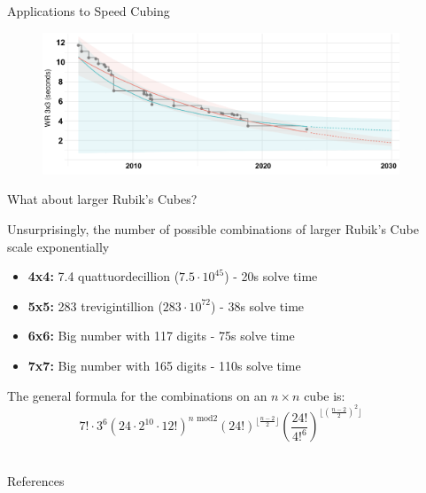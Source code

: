\documentclass[final]{beamer}
\newlength{\sepwidth}
\newlength{\colwidth}
\newcommand{\separatorcolumn}{\begin{column}{\sepwidth}\end{column}}
\begin{document}
\begin{frame}[t]
\begin{columns}[t]
\begin{column}{\colwidth}
\begin{block}{Applications to Speed Cubing}
  \begin{figure}
    \centering
      \includegraphics[width=1.0\textwidth]{logos/solveprogression.png}
  \end{figure}

  \end{block}

  \begin{block}{What about larger Rubik's Cubes?}
    
    \large Unsurprisingly, the number of possible combinations of larger Rubik's Cube scale exponentially \\
    
    \begin{itemize}
      \item \textbf{4x4:} 7.4 quattuordecillion ($7.5\cdot 10^{45}$) - 20s solve time
      \item \textbf{5x5:} 283 trevigintillion ($283 \cdot 10^{72}$) - 38s solve time
      \item \textbf{6x6:} Big number with 117 digits - 75s solve time
      \item \textbf{7x7:} Big number with 165 digits - 110s solve time
    \end{itemize}

    The general formula for the combinations on an $n \times n$ cube is: \\

    $$ \displaystyle 7! \cdot  3^6 \left( 24 \cdot 2^{10} \cdot 12!  \right)^{n \text{ mod} 2}
    (24!)^{\lfloor \frac{n-2}{2} \rfloor} \left( \displaystyle\frac{24!}{4!^{6}} 
    \right)^{\lfloor \left( \frac{n-2}{2} \right)^2 \rfloor} $$ \\


  \end{block}

  \begin{block}{References}

    \nocite{*}
    \footnotesize{}

  \end{block}

\end{column}

\separatorcolumn
\end{columns}
\end{frame}
\end{document}
